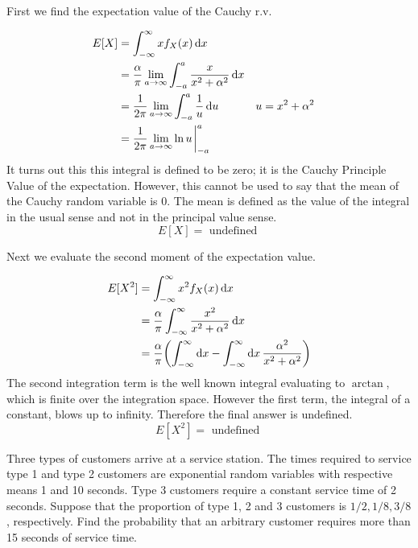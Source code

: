 \documentclass{article}
\begin{document}
    \begin{solution}
        First we find the expectation value of the Cauchy r.v.

        \begin{align*}
            E[X] &= \int_{-\infty}^{\infty} x f_X(x) \dd{x} \\
            &= \frac{\alpha}{\pi} \lim_{a \to \infty} \int_{-a}^{a} \frac{x}{x^2 + \alpha^2} \dd{x}\\
            &= \frac{1}{2\pi} \lim_{a \to \infty} \int_{-a}^{a} \frac{1}{u} \dd{u} && u = x^2 + \alpha^2 \\
            &= \frac{1}{2\pi} \lim_{a \to \infty} \ln{u}\eval^{a}_{-a}
        \end{align*}
        It turns out this this integral is defined to be zero; it is the Cauchy Principle Value of the expectation. However, this cannot be used to say that the mean of the Cauchy random variable is 0. The mean is defined as the value of the integral in the usual sense and not in the principal value sense.
        \begin{equation}
            E[X] = \text{ undefined }
        \end{equation}

        Next we evaluate the second moment of the expectation value.

        \begin{align*}
            E[X^2] &= \int_{-\infty}^{\infty} x^2 f_X(x) \dd{x} \\
            &= \frac{\alpha}{\pi} \int_{-\infty}^{\infty} \frac{x^2}{x^2 + \alpha^2} \dd{x} \\
            &= \frac{\alpha}{\pi} \quantity(\int_{-\infty}^{\infty} \dd{x} - \int_{-\infty}^{\infty} \dd{x} \frac{\alpha^2}{x^2 + \alpha^2})
        \end{align*}
        The second integration term is the well known integral evaluating to $\arctan$, which is finite over the integration space. However the first term, the integral of a constant, blows up to infinity. Therefore the final answer is undefined.
        \begin{equation}
            E[X^2] = \text{ undefined }
        \end{equation}

    \end{solution}

    \nextproblem
    \begin{problem}
        Three types of customers arrive at a service station. The times required to service type 1 and type 2 customers are exponential random variables with respective means 1 and 10 seconds. Type 3 customers require a constant service time of 2 seconds. Suppose that the proportion of type 1, 2 and 3 customers is $1/2, 1/8 , 3/8$, respectively. Find the probability that an arbitrary customer requires more than 15 seconds of service time.
    \end{problem}
\end{document}
